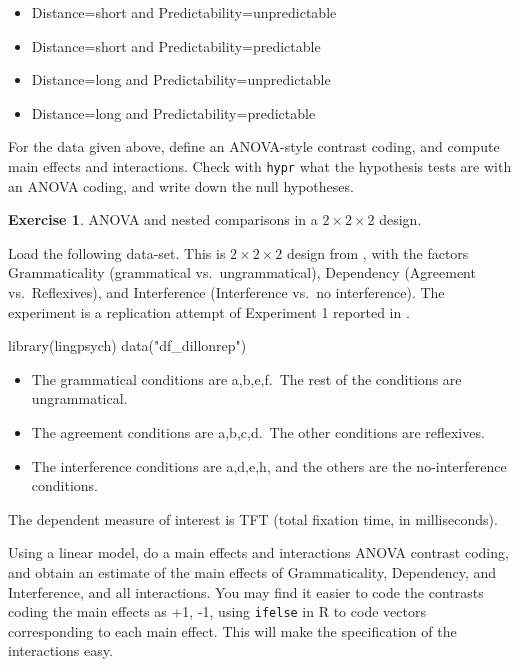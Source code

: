 \documentclass[
  12pt,
]{krantz}
\newenvironment{Shaded}{\begin{snugshade}}{\end{snugshade}}
\newcommand{\FunctionTok}[1]{\textcolor[rgb]{0.00,0.00,0.00}{#1}}
\newcommand{\NormalTok}[1]{#1}
\newcommand{\StringTok}[1]{\textcolor[rgb]{0.31,0.60,0.02}{#1}}
\providecommand{\tightlist}{%
  \setlength{\itemsep}{0pt}\setlength{\parskip}{0pt}}
\theoremstyle{definition}
\theoremstyle{definition}
\theoremstyle{definition}
\newtheorem{exercise}{Exercise}[chapter]
\theoremstyle{definition}
\theoremstyle{remark}
\begin{document}
\begin{itemize}
\tightlist
\item
  Distance=short and Predictability=unpredictable
\item
  Distance=short and Predictability=predictable
\item
  Distance=long and Predictability=unpredictable
\item
  Distance=long and Predictability=predictable
\end{itemize}

For the data given above, define an ANOVA-style contrast coding, and compute main effects and interactions. Check with \texttt{hypr} what the hypothesis tests are with an ANOVA coding, and write down the null hypotheses.

\begin{exercise}
\protect\hypertarget{exr:Contrasts2x2x2Dillon2013}{}\label{exr:Contrasts2x2x2Dillon2013}ANOVA and nested comparisons in a \(2\times 2\times 2\) design.
\end{exercise}

Load the following data-set. This is \(2\times 2\times 2\) design from \citet{jager2020interference}, with the factors Grammaticality (grammatical vs.~ungrammatical), Dependency (Agreement vs.~Reflexives), and Interference (Interference vs.~no interference). The experiment is a replication attempt of Experiment 1 reported in \citet{Dillon-EtAl-2013}.

\begin{Shaded}
\begin{Highlighting}[]
\FunctionTok{library}\NormalTok{(lingpsych)}
\FunctionTok{data}\NormalTok{(}\StringTok{"df\_dillonrep"}\NormalTok{)}
\end{Highlighting}
\end{Shaded}

\begin{itemize}
\tightlist
\item
  The grammatical conditions are a,b,e,f.~The rest of the conditions are ungrammatical.
\item
  The agreement conditions are a,b,c,d.~The other conditions are reflexives.
\item
  The interference conditions are a,d,e,h, and the others are the no-interference conditions.
\end{itemize}

The dependent measure of interest is TFT (total fixation time, in milliseconds).

Using a linear model, do a main effects and interactions ANOVA contrast coding, and obtain an estimate of the main effects of Grammaticality, Dependency, and Interference, and all interactions. You may find it easier to code the contrasts coding the main effects as +1, -1, using \texttt{ifelse} in R to code vectors corresponding to each main effect. This will make the specification of the interactions easy.
\end{document}
